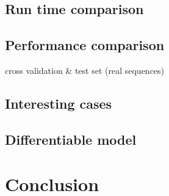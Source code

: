\documentclass{article}
\begin{document}

\subsection{Run time comparison}

\subsection{Performance comparison}

cross validation & test set (real sequences)

\subsection{Interesting cases}

\subsection{Differentiable model}


\section{Conclusion}

\clearpage




%
%
%
\end{document}
